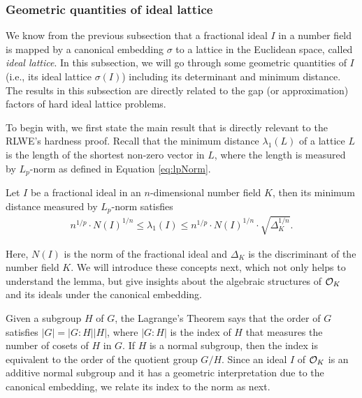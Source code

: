 \documentclass[../main.tex]{subfiles}
\begin{document}
\subsubsection{Geometric quantities of ideal lattice}

We know from the previous subsection that a fractional ideal $I$ in a number field is mapped by a canonical embedding $\sigma$ to a lattice in the Euclidean space, called \textit{ideal lattice}. In this subsection, we will go through some geometric quantities of $I$ (i.e., its ideal lattice $\sigma(I)$) including its determinant and minimum distance. The results in this subsection are directly related to the gap (or approximation) factors of hard ideal lattice problems. 



To begin with, we first state the main result that is directly relevant to the RLWE's hardness proof. Recall that the minimum distance $\lambda_1(L)$ of a lattice $L$ is the length of the shortest non-zero vector in $L$, where the length is measured by $L_p$-norm as defined in Equation \ref{eq:lpNorm}.

\begin{lemma}
Let $I$ be a fractional ideal in an $n$-dimensional number field $K$, then its minimum distance measured by $L_p$-norm satisfies 
\begin{align}
\label{eq:minDistBound}
    n^{1/p} \cdot N(I)^{1/n} \le \lambda_1(I) \le n^{1/p} \cdot N(I)^{1/n} \cdot \sqrt{\Delta_K^{1/n}}.
\end{align}
\end{lemma}

Here, $N(I)$ is the norm of the fractional ideal and $\Delta_K$ is the discriminant of the number field $K$. We will introduce these concepts next, which not only helps to understand the lemma, but give insights about the algebraic structures of $\mathcal{O}_K$ and its ideals under the canonical embedding. 

Given a subgroup $H$ of $G$, the Lagrange's Theorem says that the order of $G$ satisfies $|G|=|G:H||H|$, where $|G:H|$ is the index of $H$ that measures the number of cosets of $H$ in $G$. If $H$ is a normal subgroup, then the index is equivalent to the order of the quotient group $G/H$. Since an ideal $I$ of $\mathcal{O}_K$ is an additive normal subgroup and it has a geometric interpretation due to the canonical embedding, we relate its index to the norm as next.    
\end{document}
